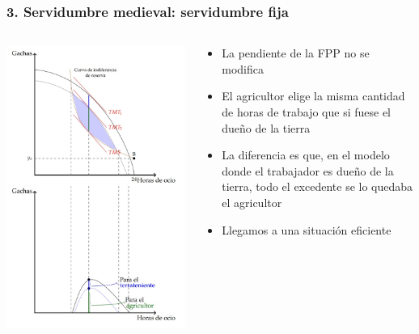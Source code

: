 \documentclass{beamer}
\begin{document}
\begin{frame}
\frametitle{3. Servidumbre medieval: servidumbre fija}

\begin{columns}
  \begin{column}{0.55\textwidth}
    \centering
    \includegraphics[scale=0.55]{../Figures/C19.14.jpg}
  \end{column}

\begin{column}{0.45\textwidth}
    \begin{itemize}
        \item \small La pendiente de la FPP no se modifica
        \item \small El agricultor elige la misma cantidad de horas de trabajo que si fuese el dueño de la tierra    \item \small La diferencia es que, en el modelo donde el trabajador es dueño de la tierra, todo el excedente se lo quedaba el agricultor
        \item \small Llegamos a una situación eficiente
    \end{itemize}
  \end{column}
\end{columns}

\end{frame}
\end{document}
